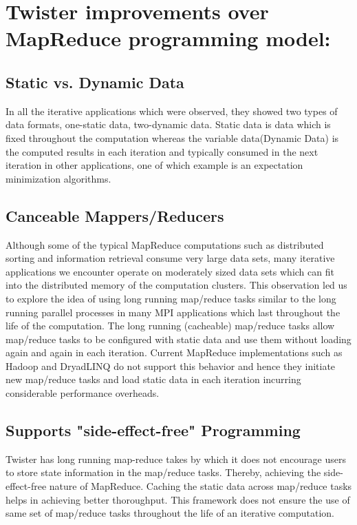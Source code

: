 \documentclass[9pt,twocolumn,twoside]{../../styles/osajnl}
\begin{document}
\section{Twister improvements over MapReduce programming model:}
\label{sec:examples}


\subsection{Static vs. Dynamic Data}
In all the iterative applications which were observed, they showed two
types of data formats, one-static data, two-dynamic data\cite{grolinger2014challenges}.  Static data
is data which is fixed throughout the computation whereas the variable
data(Dynamic Data) is the computed results in each iteration and
typically consumed in the next iteration in other applications, one of
which example is an expectation minimization algorithms\cite{doulkeridis2014survey}.

\subsection{Canceable Mappers/Reducers}
Although some of the typical MapReduce computations such as
distributed sorting and information retrieval consume very large data
sets, many iterative applications we encounter operate on moderately
sized data sets which can fit into the distributed memory of the
computation clusters\cite{elsayed2014mapreduce}. This observation led
us to explore the idea of using long running map/reduce tasks similar
to the long running parallel processes in many MPI applications which
last throughout the life of the computation. The long running
(cacheable) map/reduce tasks allow map/reduce tasks to be configured
with static data and use them without loading again and again in each
iteration\cite{lee2012parallel}. Current MapReduce implementations
such as Hadoop and DryadLINQ do not support this behavior and hence
they initiate new map/reduce tasks and load static data in each
iteration incurring considerable performance overheads\cite{twister}.

\subsection{Supports "side-effect-free" Programming}
Twister has long running map-reduce takes by which it does not
encourage users to store state information in the map/reduce
tasks. Thereby, achieving the side-effect-free nature of
MapReduce. Caching the static data across map/reduce tasks helps in
achieving better thoroughput\cite{lee2012parallel}. This framework
does not ensure the use of same set of map/reduce tasks throughout the
life of an iterative computation\cite{twister}.
\end{document}
